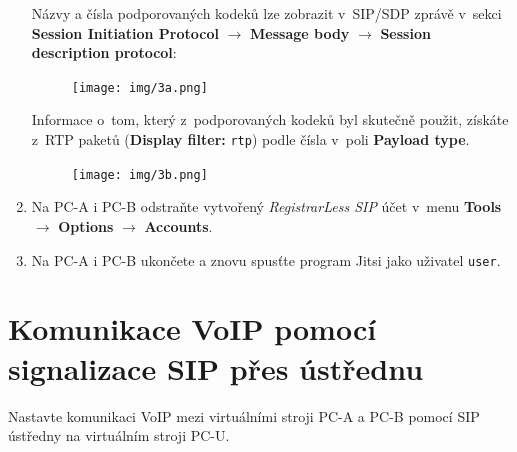 \begin{enumerate}
Názvy a čísla podporovaných kodeků lze zobrazit v SIP/SDP zprávě v sekci {\bf Session Initiation Protocol} $\rightarrow$ {\bf Message body} $\rightarrow$ {\bf Session description protocol}:
\begin{figure}[H]
  \centering
  \texttt{[image: img/3a.png]}
\end{figure}

\noindent Informace o~tom, který z podporovaných kodeků byl skutečně použit, získáte z RTP paketů (\textbf{Display filter:} \texttt{rtp}) podle čísla v poli {\bf Payload type}.
\begin{figure}[H]
  \centering
  \texttt{[image: img/3b.png]}
\end{figure}


    \item Na PC-A i PC-B odstraňte vytvořený \emph{RegistrarLess SIP} účet v~menu {\bf Tools} $\rightarrow$ {\bf Options} $\rightarrow$ {\bf Accounts}.
    \item Na PC-A i PC-B ukončete a znovu spusťte program Jitsi jako uživatel \texttt{user}.
\end{enumerate}

\section{Komunikace VoIP pomocí signalizace SIP přes ústřednu}
Nastavte komunikaci VoIP mezi virtuálními stroji PC-A a PC-B pomocí SIP ústředny na virtuálním stroji PC-U.

